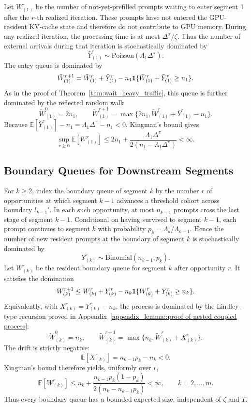 Let \(W^r_{(1)}\) be the number of not-yet-prefilled prompts waiting to enter segment 1 after the \(r\)-th realized iteration. These prompts have not entered the GPU-resident KV-cache state and therefore do not contribute to GPU memory. During any realized iteration, the processing time is at most \(\Delta^\pi/\zeta\). Thus the number of external arrivals during that iteration is stochastically dominated by
\[
    \bar Y^r_{(1)}\sim \mathrm{Poisson}(\Lambda_1\Delta^\pi).
\]
The entry queue is dominated by
\[
    \bar W^{r+1}_{(1)}
    =
    \bar W^r_{(1)}+\bar Y^r_{(1)}
    -
    n_1{\bf 1}\{\bar W^r_{(1)}+\bar Y^r_{(1)}\ge n_1\}.
\]
As in the proof of Theorem~\ref{thm:wait_heavy_traffic}, this queue is further dominated by the reflected random walk
\[
    \widetilde W^0_{(1)}=2n_1,\qquad
    \widetilde W^{r+1}_{(1)}
    =
    \max\{2n_1,\widetilde W^r_{(1)}+\bar Y^r_{(1)}-n_1\}.
\]
Because \(\mathbb{E}[\bar Y^r_{(1)}]-n_1=\Lambda_1\Delta^\pi-n_1<0\), Kingman's bound gives
\[
    \sup_{r\ge0}\mathbb{E}[W^r_{(1)}]
    \le
    2n_1+
    \frac{\Lambda_1\Delta^\pi}{2(n_1-\Lambda_1\Delta^\pi)}
    <\infty .
\]

\subsection{Boundary Queues for Downstream Segments}

For \(k\ge2\), index the boundary queue of segment \(k\) by the number \(r\) of opportunities at which segment \(k-1\) advances a threshold cohort across boundary \(l_{k-1}'\). In each such opportunity, at most \(n_{k-1}\) prompts cross the last stage of segment \(k-1\). Conditional on having survived to segment \(k-1\), each prompt continues to segment \(k\) with probability \(p_k=\Lambda_k/\Lambda_{k-1}\). Hence the number of new resident prompts at the boundary of segment \(k\) is stochastically dominated by
\[
    Y^r_{(k)}\sim \mathrm{Binomial}(n_{k-1},p_k).
\]
Let \(W^r_{(k)}\) be the resident boundary queue for segment \(k\) after opportunity \(r\). It satisfies the domination
\[
    W^{r+1}_{(k)}
    \le
    W^r_{(k)}+Y^r_{(k)}
    -
    n_k{\bf 1}\{W^r_{(k)}+Y^r_{(k)}\ge n_k\}.
\]
Equivalently, with \(X^r_{(k)}=Y^r_{(k)}-n_k\), the process is dominated by the Lindley-type recursion proved in Appendix~\ref{appendix_lemma::proof of nested coupled process}:
\[
    \widetilde W^0_{(k)}=n_k,\qquad
    \widetilde W^{r+1}_{(k)}
    =
    \max\{n_k,\widetilde W^r_{(k)}+X^r_{(k)}\}.
\]
The drift is strictly negative:
\[
    \mathbb{E}[X^r_{(k)}]=n_{k-1}p_k-n_k<0.
\]
Kingman's bound therefore yields, uniformly over \(r\),
\[
    \mathbb{E}[W^r_{(k)}]
    \le
    n_k+
    \frac{n_{k-1}p_k(1-p_k)}{2(n_k-n_{k-1}p_k)}
    <\infty,\qquad k=2,\ldots,m.
\]
Thus every boundary queue has a bounded expected size, independent of \(\zeta\) and \(T\).

